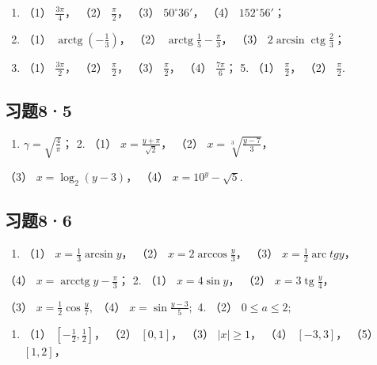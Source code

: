 \begin{enumerate}
\item
  （1） \(\frac{3\pi}{4}\)， （2） \(\frac{\pi}{2}\)， （3）
  \(50^{\circ}36'\)， （4） \(152^{\circ}56'\)；
\item
  （1） \(\operatorname{arctg}\left(-\frac{1}{3}\right)\)， （2）
  \(\operatorname{arctg}\frac{1}{5} - \frac{\pi}{3}\)， （3）
  \(2\arcsin \operatorname{ctg}\frac{2}{3}\)；
\item
  （1） \(\frac{3\pi}{2}\)， （2） \(\frac{\pi}{2}\)， （3）
  \(\frac{\pi}{2}\)， （4） \(\frac{7\pi}{6}\)； 5. （1）
  \(\frac{\pi}{2}\)， （2） \(\frac{\pi}{2}\).
\end{enumerate}

\subsection{习题8·5}

\begin{enumerate}
\item
  \(\gamma = \sqrt{\frac{4}{\pi}}\)； 2. （1）
  \(x = \frac{y + \pi}{\sqrt{2}}\)， （2）
  \(x = \sqrt[3]{\frac{y - 7}{3}}\)，
\end{enumerate}

（3） \(x = \log_2(y - 3)\)， （4） \(x = 10^y - \sqrt{5}\).

\subsection{习题8·6}

\begin{enumerate}
\item
  （1） \(x = \frac{1}{3}\arcsin y\)， （2）
  \(x = 2\arccos \frac{y}{3}\)， （3）
  \(x = \frac{1}{2}\operatorname{arc} t g y\)，
\end{enumerate}

（4） \(x = \operatorname{arcctg} y - \frac{\pi}{3}\)； 2. （1）
\(x = 4\sin y\)， （2） \(x = 3\operatorname{tg} \frac{y}{4}\)，

（3） \(x = \frac{1}{2}\cos \frac{y}{7},\) （4）
\(x = \sin \frac{y - 3}{5};\) 4. （2） \(0\leqslant a\leqslant 2;\)

\begin{enumerate}[start=5]
\item
  （1） \(\left[-\frac{1}{2}, \frac{1}{2}\right]\)， （2） \([0, 1]\)，
  （3） \(|x| \geqslant 1\)， （4） \([-3, 3]\)， （5） \([1, 2]\)，
\end{enumerate}

